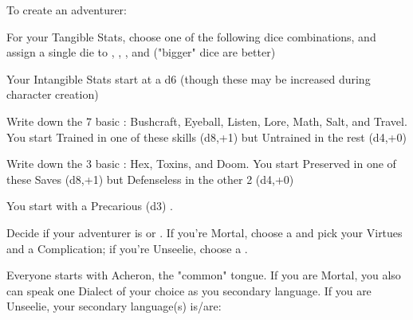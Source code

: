 {  

To create an adventurer:


For your Tangible Stats, choose one of the following dice combinations, and assign a single die to \VIG, \DEX, \INT, and \FOC ("bigger" dice are better)


Your Intangible Stats start at a d6 (though these may be increased during character creation)



Write down the 7 basic : Bushcraft, Eyeball, Listen, Lore, Math, Salt, and Travel.  You start Trained in one of these skills (d8,+1) but Untrained in the rest (d4,+0)


Write down the 3 basic :  Hex, Toxins, and Doom.  You start Preserved in one of these Saves (d8,+1) but Defenseless in the other 2 (d4,+0)


You start with a Precarious (d3) \DEATH.



Decide if your adventurer is  or .  If you're Mortal, choose a  and pick your Virtues and a Complication; if you're Unseelie, choose a .


Everyone starts with Acheron, the "common" tongue. If you are Mortal, you also can speak one Dialect of your choice as you secondary language.  If you are Unseelie, your secondary language(s) is/are:


}
